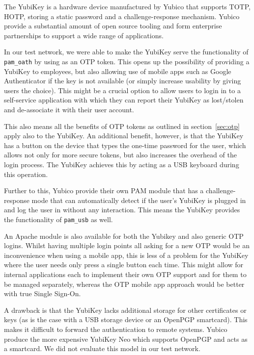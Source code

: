 \documentclass{report}
\begin{document}
The YubiKey \parencite{merkel2009yubikey} is a hardware device
manufactured by Yubico that supports TOTP, HOTP, storing a static password and
a challenge-response mechanism. Yubico provide a substantial amount of
open source tooling and form enterprise partnerships to support a wide
range of applications.

In our test network, we were able to make the YubiKey serve the functionality
of \texttt{pam\_oath} by using as an OTP token. This opens up the possibility
of providing a YubiKey to employees, but also allowing use of mobile apps
such as Google Authenticator if the key is not available (or simply increase
usability by giving users the choice). This might be a crucial option to
allow users to login in to a self-service application with which they can
report their YubiKey as lost/stolen and de-associate it with their user
account.

This also means all the benefits of OTP tokens as outlined in
section~\ref{sec:otp} apply also to the YubiKey. An additional benefit,
however, is that the YubiKey has a button on the device that types the
one-time password for the user, which allows not only for more secure tokens,
but also increases the overhead of the login process. The YubiKey achieves
this by acting as a USB keyboard during this operation.

Further to this, Yubico provide their own PAM module that has a challenge-response
mode that can automatically detect if the user's YubiKey is plugged in
and log the user in without any interaction. This means the YubiKey provides
the functionality of \texttt{pam\_usb} as well.

An Apache module is also available
for both the Yubikey and also generic OTP logins. Whilst having multiple
login points all asking for a new OTP would be an inconvenience when using a mobile
app, this is less of a problem for the YubiKey where the user needs only press
a single button each time. This might allow for internal applications each to
implement their own OTP support and for them to be managed separately, whereas
the OTP mobile app approach would be better with true Single Sign-On.

A drawback is that the YubiKey lacks additional storage for other certificates
or keys (as is the case with a USB storage device or an OpenPGP smartcard). This
makes it difficult to forward the authentication to remote systems. Yubico
produce the more expensive YubiKey Neo which supports OpenPGP and acts as
a smartcard. We did not evaluate this model in our test network.
\end{document}
